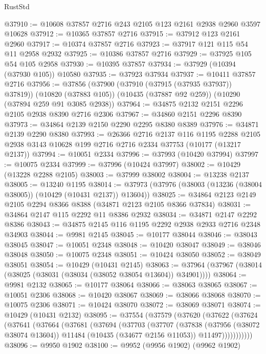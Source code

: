 \begin{lexlean}{RustStd}
\begin{coremodule}
@37910 := @10608 @37857 @2716 @243 @2105 @123 @2161 @2938 @2960 @3597 @10628
@37912 := @10365 @37857 @2716
@37915 := @37912 @123 @2161 @2960
@37917 := @10374 @37857 @2716
@37923 := @37917 @121 @115 @54 @11 @2958 @2932
@37925 := @10386 @37857 @2716
@37929 := @37925 @105 @54 @105 @2958
@37930 := @10395 @37857
@37934 := @37929 (@10394 (@37930 @105)) @10580
@37935 := @37923 @37934
@37937 := @10411 @37857 @2716
@37956 := @37856
    (@37900 (@37910 (@37915 (@37935 @37937)) @37819))
    (@10820 (@37883 @105))
    (@10435 (@37887 @92 @259))
    (@10290 (@37894 @259 @91 @3085 @2938))
@37964 := @34875 @2132 @2151 @2296 @2105 @2938 @8390 @2716 @2306
@37967 := @34860 @2151 @2296 @8390
@37973 := @34864 @2139 @2150 @2290 @2295 @8380 @8389
@37976 := @34871 @2139 @2290 @8380
@37993 := @26366
    @2716
    @2137
    @116
    @1195
    @2288
    @2105
    @2938
    @3143
    @10628
    @199
    @2716
    @2716
    @2334
    @37753
    (@10177 (@13217 @2137))
@37994 := @10051 @2334
@37996 := @37993 (@10420 @37994)
@37997 := @10075 @2334
@37999 := @37996 (@10424 @37997)
@38002 := @10429 (@13228 @2288 @2105)
@38003 := @37999 @38002
@38004 := @13238 @2137
@38005 := @13240 @1195
@38014 := @37973 (@37976 (@38003 (@13236 (@38004 @38005)) (@10429 (@10431 @2137)) @13604))
@38025 := @34864 @2123 @2149 @2105 @2294 @8366 @8388 (@34871 @2123 @2105 @8366 @37834)
@38031 := @34864 @2147 @115 @2292 @11 @8386 @2932
@38034 := @34871 @2147 @2292 @8386
@38043 := @34875 @2145 @116 @1195 @2292 @2938 @2933 @2716 @2348 @34903
@38044 := @9981 @2145
@38045 := @10177 @38044
@38046 := @38043 @38045
@38047 := @10051 @2348
@38048 := @10420 @38047
@38049 := @38046 @38048
@38050 := @10075 @2348
@38051 := @10424 @38050
@38052 := @38049 @38051
@38054 := @10429 (@10431 @2145)
@38063 := @37964 (@37967 (@38014 (@38025 (@38031 (@38034 (@38052 @38054 @13604)) @34901))))
@38064 := @9981 @2132
@38065 := @10177 @38064
@38066 := @38063 @38065
@38067 := @10051 @2306
@38068 := @10420 @38067
@38069 := @38066 @38068
@38070 := @10075 @2306
@38071 := @10424 @38070
@38072 := @38069 @38071
@38074 := @10429 (@10431 @2132)
@38095 := @37554
    (@37579
      (@37620
        (@37622
          (@37624
            (@37641
              (@37664
                (@37681
                  (@37694
                    (@37703
                      (@37707
                        (@37838
                          (@37956 (@38072 @38074 @13604))
                          @11484
                          (@10435 (@34677 @2156 @11053))
                          @11497)))))))))))
@38096 := @9950 @1902
@38100 := @9952 (@9956 @1902) (@9962 @1902)

\end{coremodule}
\end{lexlean}
